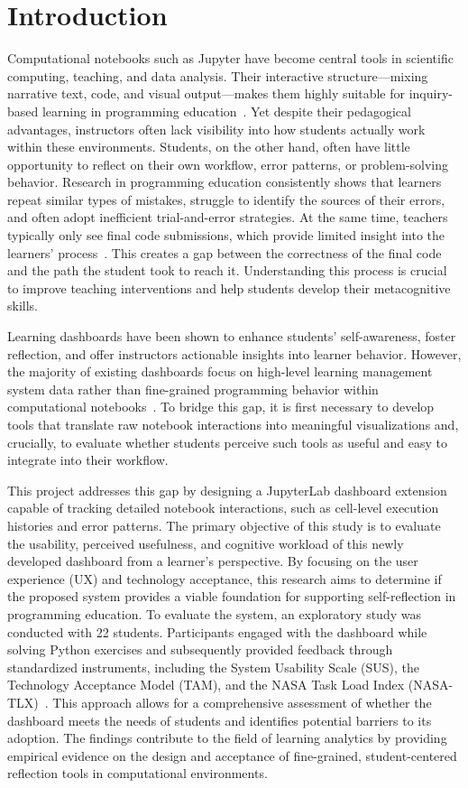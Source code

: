 \section{Introduction}
Computational notebooks such as Jupyter have become central tools in scientific computing, teaching, and data analysis. Their interactive structure—mixing narrative text, code, and visual output—makes them highly suitable for inquiry-based learning in programming education~\cite{perkel2018jupyter}. Yet despite their pedagogical advantages, instructors often lack visibility into how students actually work within these environments. Students, on the other hand, often have little opportunity to reflect on their own workflow, error patterns, or problem-solving behavior. Research in programming education consistently shows that learners repeat similar types of mistakes, struggle to identify the sources of their errors, and often adopt inefficient trial-and-error strategies. At the same time, teachers typically only see final code submissions, which provide limited insight into the learners' process~\cite{robinson2022error}. This creates a gap between the correctness of the final code and the path the student took to reach it. Understanding this process is crucial to improve teaching interventions and help students develop their metacognitive skills.

Learning dashboards have been shown to enhance students' self-awareness, foster reflection, and offer instructors actionable insights into learner behavior. However, the majority of existing dashboards focus on high-level learning management system data rather than fine-grained programming behavior within computational notebooks~\cite{paulsen2024learning}. To bridge this gap, it is first necessary to develop tools that translate raw notebook interactions into meaningful visualizations and, crucially, to evaluate whether students perceive such tools as useful and easy to integrate into their workflow.

This project addresses this gap by designing a JupyterLab dashboard extension capable of tracking detailed notebook interactions, such as cell-level execution histories and error patterns. The primary objective of this study is to evaluate the usability, perceived usefulness, and cognitive workload of this newly developed dashboard from a learner's perspective. By focusing on the user experience (UX) and technology acceptance, this research aims to determine if the proposed system provides a viable foundation for supporting self-reflection in programming education.
To evaluate the system, an exploratory study was conducted with 22 students. Participants engaged with the dashboard while solving Python exercises and subsequently provided feedback through standardized instruments, including the System Usability Scale (SUS), the Technology Acceptance Model (TAM), and the NASA Task Load Index (NASA-TLX)~\cite{germanupa_sus, davis1989technology, hart1988development}. This approach allows for a comprehensive assessment of whether the dashboard meets the needs of students and identifies potential barriers to its adoption. The findings contribute to the field of learning analytics by providing empirical evidence on the design and acceptance of fine-grained, student-centered reflection tools in computational environments.
